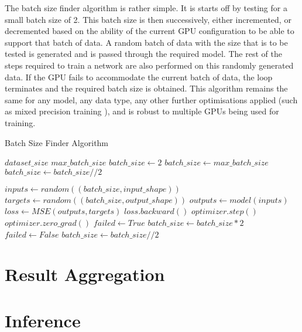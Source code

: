 The batch size finder algorithm is rather simple. It is starts off by testing for a small batch size of 2. This batch size is then successively, either incremented, or decremented based on the ability of the current GPU configuration to be able to support that batch of data. 
A random batch of data with the size that is to be tested is generated and is passed through the required model. The rest of the steps required to train a network are also performed on this randomly generated data. If the GPU fails to accommodate the current batch of data, the loop terminates and the required batch size is obtained.
This algorithm remains the same for any model, any data type, any other further optimisations applied (such as mixed precision training \cite{micikeviciusMixedPrecisionTraining2017}), and is robust to multiple GPUs being used for training.
\begin{algorithm}
    \caption{Batch Size Finder Algorithm}
    \label{alg:batch_size_finder}
    \begin{algorithmic}
        \REQUIRE $dataset\_size$
        \REQUIRE $max\_batch\_size$
        \STATE $batch\_size \leftarrow 2$
        \STATE $batch\_size \leftarrow max\_batch\_size$
        \ENDIF
        \STATE $batch\_size \leftarrow batch\_size // 2$
        \ENDIF

        \LOOP
        \STATE $inputs \leftarrow random((batch\_size,input\_shape))$
        \STATE $targets \leftarrow random((batch\_size,output\_shape))$
        \STATE $outputs \leftarrow model(inputs)$
        \STATE $loss \leftarrow MSE(outputs, targets)$
        \STATE $loss.backward()$
        \STATE $optimizer.step()$
        \STATE $optimizer.zero\_grad()$
        \STATE $failed \leftarrow True$
        \STATE $batch\_size \leftarrow batch\_size * 2$
        \ENDLOOP
        \STATE $failed \leftarrow False$
        \STATE $batch\_size \leftarrow batch\_size // 2$
        \ENDIF

        \ENDWHILE

    \end{algorithmic}
\end{algorithm}

\section{Result Aggregation} \label{sec:result_aggregation}

\section{Inference}